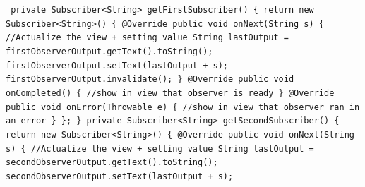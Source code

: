 \documentclass[12pt,oneside,a4paper,bibtotoc,liststotoc]{scrreprt}
\begin{document}
\texttt{\newline
private Subscriber<String> getFirstSubscriber() \{\newline
\newline
       return new Subscriber<String>() \{\newline
           @Override\newline
           public void onNext(String s) \{\newline
               //Actualize the view + setting value\newline
               String lastOutput = firstObserverOutput.getText().toString();\newline
               firstObserverOutput.setText(lastOutput + s);\newline
\newline
               firstObserverOutput.invalidate();\newline
           \}\newline
\newline
           @Override\newline
           public void onCompleted() \{\newline
               //show in view that observer is ready\newline
           \}\newline
\newline
           @Override\newline
           public void onError(Throwable e) \{\newline
               //show in view that observer ran in an error\newline
           \}\newline
       \};\newline
   \}\newline
\newline
   private Subscriber<String> getSecondSubscriber() \{\newline
\newline
       return new Subscriber<String>() \{\newline
           @Override\newline
           public void onNext(String s) \{\newline
               //Actualize the view + setting value\newline
               String lastOutput = secondObserverOutput.getText().toString();\newline
               secondObserverOutput.setText(lastOutput + s);\newline
}
\end{document}
